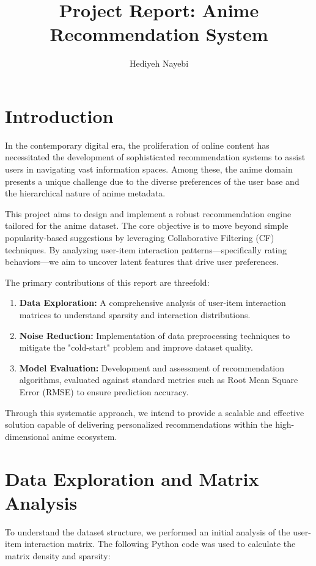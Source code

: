 \documentclass[12pt]{article}
\title{Project Report: Anime Recommendation System}
\author{Hediyeh Nayebi}
\begin{document}
	
	\maketitle
	
	\section{Introduction}
	
	In the contemporary digital era, the proliferation of online content has necessitated the development of sophisticated recommendation systems to assist users in navigating vast information spaces. Among these, the anime domain presents a unique challenge due to the diverse preferences of the user base and the hierarchical nature of anime metadata. 
	
	This project aims to design and implement a robust recommendation engine tailored for the anime dataset. The core objective is to move beyond simple popularity-based suggestions by leveraging Collaborative Filtering (CF) techniques. By analyzing user-item interaction patterns—specifically rating behaviors—we aim to uncover latent features that drive user preferences. 
	
	The primary contributions of this report are threefold:
	\begin{enumerate}
		\item \textbf{Data Exploration:} A comprehensive analysis of user-item interaction matrices to understand sparsity and interaction distributions.
		\item \textbf{Noise Reduction:} Implementation of data preprocessing techniques to mitigate the "cold-start" problem and improve dataset quality.
		\item \textbf{Model Evaluation:} Development and assessment of recommendation algorithms, evaluated against standard metrics such as Root Mean Square Error (RMSE) to ensure prediction accuracy.
	\end{enumerate}
	
	Through this systematic approach, we intend to provide a scalable and effective solution capable of delivering personalized recommendations within the high-dimensional anime ecosystem.
	\newpage
	\section{Data Exploration and Matrix Analysis}
	
	To understand the dataset structure, we performed an initial analysis of the user-item interaction matrix. The following Python code was used to calculate the matrix density and sparsity:
	
\end{document}
